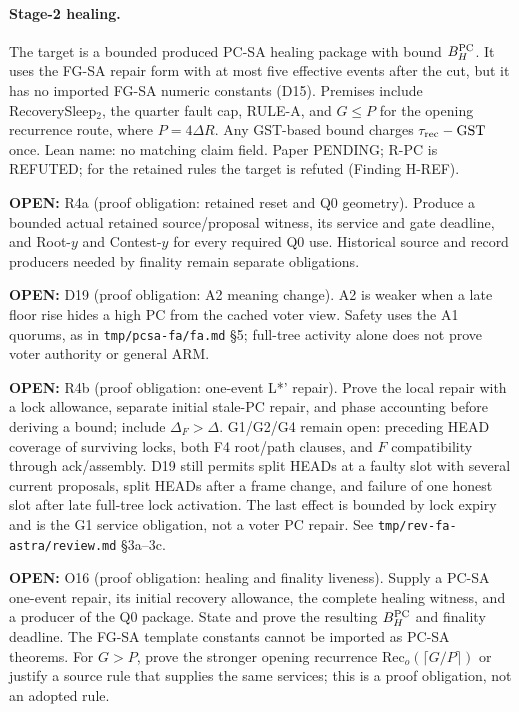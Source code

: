 \documentclass{article}
\newcommand{\OPEN}[1]{\par\noindent\textbf{OPEN:} #1\par}
\newcommand{\nm}[1]{\nolinkurl{#1}}
\begin{document}
\paragraph{Stage-2 healing.}
The target is a bounded produced PC-SA healing package with bound
$B_H^{\rm PC}$. It uses the FG-SA repair form with at most five effective
events after the cut, but it has no imported FG-SA numeric constants (D15).
Premises include RecoverySleep$_2$, the quarter fault cap, RULE-A, and
$G\leq P$ for the opening recurrence route, where $P=4\Delta R$.
Any GST-based bound charges $\tau_{\rm rec}-\mathrm{GST}$ once.
Lean name: no matching claim field. Paper PENDING; R-PC is REFUTED; for the retained rules the target is refuted (Finding H-REF).
\OPEN{R4a (proof obligation: retained reset and Q0 geometry).
Produce a bounded actual retained source/proposal witness,
its service and gate deadline, and Root-$y$ and Contest-$y$
for every required Q0 use. Historical source and record
producers needed by finality remain separate obligations.}
\OPEN{D19 (proof obligation: A2 meaning change). A2 is weaker when a
late floor rise hides a high PC from the cached voter view. Safety uses
the A1 quorums, as in \nm{tmp/pcsa-fa/fa.md} \S5; full-tree activity
alone does not prove voter authority or general ARM.}
\OPEN{R4b (proof obligation: one-event L*' repair). Prove the local repair
with a lock allowance, separate initial stale-PC repair, and phase
accounting before deriving a bound; include $\Delta_F>\Delta$.
G1/G2/G4 remain open: preceding HEAD coverage of surviving locks,
both F4 root/path clauses, and $F$ compatibility through ack/assembly.
D19 still permits split HEADs at a faulty slot with several current
proposals, split HEADs after a frame change, and failure of one honest
slot after late full-tree lock activation. The last effect is bounded by
lock expiry and is the G1 service obligation, not a voter PC repair.
See \nm{tmp/rev-fa-astra/review.md} \S3a--3c.}
\OPEN{O16 (proof obligation: healing and finality liveness). Supply a PC-SA one-event repair,
its initial recovery allowance, the complete healing witness, and a
producer of the Q0 package. State and prove the resulting $B_H^{\rm PC}$
and finality deadline. The FG-SA template constants cannot be imported as
PC-SA theorems. For $G>P$, prove the stronger opening recurrence
$\mathrm{Rec}_o(\lceil G/P\rceil)$ or justify a source rule that supplies
the same services; this is a proof obligation, not an adopted rule.}
\end{document}
